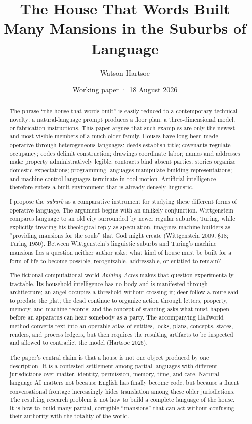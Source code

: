 \documentclass[11pt]{article}
\title{\bfseries The House That Words Built\\[0.35em]\large Many Mansions in the Suburbs of Language}
\author{Watson Hartsoe}
\date{Working paper · 18 August 2026}
\begin{document}
\maketitle

\begin{abstract}
The phrase ``the house that words built'' is easily reduced to a contemporary technical novelty: a natural-language prompt produces a floor plan, a three-dimensional model, or fabrication instructions. This paper argues that such examples are only the newest and most visible members of a much older family. Houses have long been made operative through heterogeneous languages: deeds establish title; covenants regulate occupancy; codes delimit construction; drawings coordinate labor; names and addresses make property administratively legible; contracts bind absent parties; stories organize domestic expectations; programming languages manipulate building representations; and machine-control languages terminate in tool motion. Artificial intelligence therefore enters a built environment that is already densely linguistic.

I propose the \emph{suburb} as a comparative instrument for studying these different forms of operative language. The argument begins with an unlikely conjunction. Wittgenstein compares language to an old city surrounded by newer regular suburbs; Turing, while explicitly treating his theological reply as speculation, imagines machine builders as ``providing mansions for the souls'' that God might create (Wittgenstein 2009, §18; Turing 1950). Between Wittgenstein's linguistic suburbs and Turing's machine mansions lies a question neither author asks: what kind of house must be built for a form of life to become possible, recognizable, addressable, or entitled to remain?

The fictional-computational world \emph{Abiding Acres} makes that question experimentally tractable. Its household intelligence has no body and is manifested through architecture; an angel occupies a threshold without crossing it; deer follow a route said to predate the plat; the dead continue to organize action through letters, property, memory, and machine records; and the concept of standing asks what must happen before an apparatus can hear somebody as a party. The accompanying Halfworld method converts text into an operable atlas of entities, locks, plans, concepts, states, renders, and process ledgers, but then requires the resulting artifacts to be inspected and allowed to contradict the model (Hartsoe 2026).

The paper's central claim is that a house is not one object produced by one description. It is a contested settlement among partial languages with different jurisdictions over matter, identity, permission, memory, time, and care. Natural-language AI matters not because English has finally become code, but because a fluent conversational frontage increasingly hides translation among these older jurisdictions. The resulting research problem is not how to build a complete language of the house. It is how to build many partial, corrigible ``mansions'' that can act without confusing their authority with the totality of the world.
\end{abstract}
\end{document}
